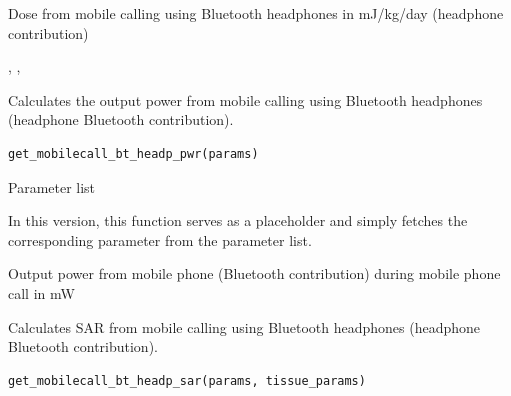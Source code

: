 \documentclass[a4paper]{book}
\begin{document}
%
\begin{Value}
Dose from mobile calling using Bluetooth headphones in mJ/kg/day (headphone contribution)
\end{Value}
%
\begin{SeeAlso}
, , 
\end{SeeAlso}
%
\begin{Description}
Calculates the output power from mobile calling using Bluetooth headphones (headphone Bluetooth contribution).
\end{Description}
%
\begin{Usage}
\begin{verbatim}
get_mobilecall_bt_headp_pwr(params)
\end{verbatim}
\end{Usage}
%
\begin{Arguments}
\begin{ldescription}
\item[\code{params}] Parameter list
\end{ldescription}
\end{Arguments}
%
\begin{Details}
In this version, this function serves as a placeholder and simply fetches the corresponding parameter from the parameter list.
\end{Details}
%
\begin{Value}
Output power from mobile phone (Bluetooth contribution) during mobile phone call in mW
\end{Value}
%
\begin{Description}
Calculates SAR from mobile calling using Bluetooth headphones (headphone Bluetooth contribution).
\end{Description}
%
\begin{Usage}
\begin{verbatim}
get_mobilecall_bt_headp_sar(params, tissue_params)
\end{verbatim}
\end{Usage}
\end{document}
